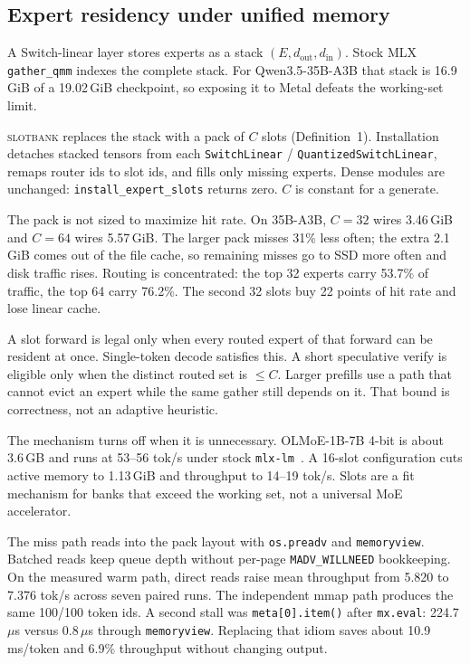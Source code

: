 \documentclass[11pt]{article}
\theoremstyle{definition}
\newcommand{\slotbank}{\textsc{slotbank}}
\begin{document}
\subsection{Expert residency under unified memory}
\label{sec:moe-design}

A Switch-linear layer stores experts as a stack $(E,d_{\mathrm{out}},d_{\mathrm{in}})$. Stock MLX \texttt{gather\_qmm} indexes the complete stack. For Qwen3.5-35B-A3B that stack is 16.9\,GiB of a 19.02\,GiB checkpoint, so exposing it to Metal defeats the working-set limit.

\slotbank{} replaces the stack with a pack of $C$ slots (Definition~1). Installation detaches stacked tensors from each \texttt{SwitchLinear} / \texttt{QuantizedSwitchLinear}, remaps router ids to slot ids, and fills only missing experts. Dense modules are unchanged: \texttt{install\_expert\_slots} returns zero. $C$ is constant for a generate.

The pack is not sized to maximize hit rate. On 35B-A3B, $C{=}32$ wires 3.46\,GiB and $C{=}64$ wires 5.57\,GiB. The larger pack misses 31\% less often; the extra 2.1\,GiB comes out of the file cache, so remaining misses go to SSD more often and disk traffic rises. Routing is concentrated: the top 32 experts carry 53.7\% of traffic, the top 64 carry 76.2\%. The second 32 slots buy 22 points of hit rate and lose linear cache.

A slot forward is legal only when every routed expert of that forward can be resident at once. Single-token decode satisfies this. A short speculative verify is eligible only when the distinct routed set is $\le C$. Larger prefills use a path that cannot evict an expert while the same gather still depends on it. That bound is correctness, not an adaptive heuristic.

The mechanism turns off when it is unnecessary. OLMoE-1B-7B 4-bit is about 3.6\,GB and runs at 53--56 tok/s under stock \texttt{mlx-lm}~\citep{olmoe}. A 16-slot configuration cuts active memory to 1.13\,GiB and throughput to 14--19 tok/s. Slots are a fit mechanism for banks that exceed the working set, not a universal MoE accelerator.

The miss path reads into the pack layout with \texttt{os.preadv} and \texttt{memoryview}. Batched reads keep queue depth without per-page \texttt{MADV\_WILLNEED} bookkeeping. On the measured warm path, direct reads raise mean throughput from 5.820 to 7.376 tok/s across seven paired runs. The independent mmap path produces the same 100/100 token ids. A second stall was \texttt{meta[0].item()} after \texttt{mx.eval}: 224.7\,$\mu$s versus 0.8\,$\mu$s through \texttt{memoryview}. Replacing that idiom saves about 10.9\,ms/token and 6.9\% throughput without changing output.
\end{document}
